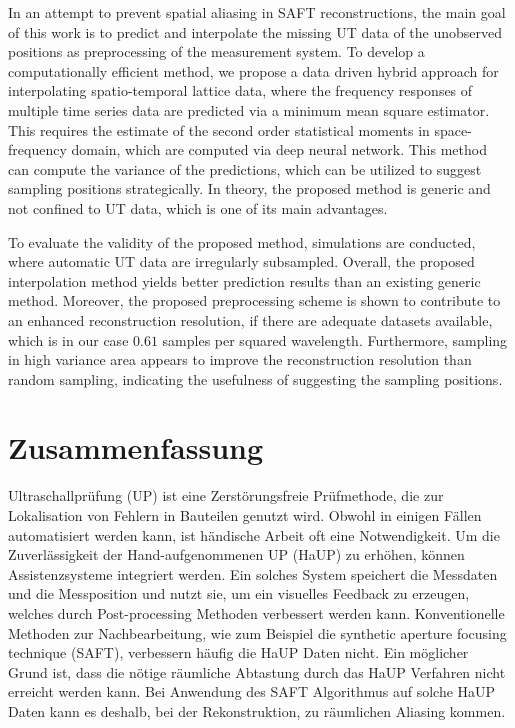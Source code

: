 In an attempt to prevent spatial aliasing in SAFT reconstructions, the main goal of this work is to predict and interpolate the missing UT data of the unobserved positions as preprocessing of the measurement system. To develop a computationally efficient method, we propose a data driven hybrid approach for interpolating spatio-temporal lattice data, where the frequency responses of multiple time series data are predicted via a minimum mean square estimator. This requires the estimate of the second order statistical moments in space-frequency domain, which are computed via deep neural network. %
This method can compute the variance of the predictions, which can be utilized to suggest sampling positions strategically. In theory, the proposed method is generic and not confined to UT data, which is one of its main advantages. \par

To evaluate the validity of the proposed method, simulations are conducted, where automatic UT data are irregularly subsampled. Overall, the proposed interpolation method yields better prediction results than an existing generic method. Moreover, the proposed preprocessing scheme is shown to contribute to an enhanced reconstruction resolution, if there are adequate datasets available, which is in our case $0.61$ samples per squared wavelength. Furthermore, sampling in high variance area appears to improve the reconstruction resolution than random sampling, indicating the usefulness of suggesting the sampling positions. \par



\chapter*{\centering Zusammenfassung} 
Ultraschallprüfung (UP) ist eine Zerstörungsfreie Prüfmethode, die zur Lokalisation von Fehlern in Bauteilen genutzt wird. Obwohl in einigen Fällen automatisiert werden kann, ist händische Arbeit oft eine Notwendigkeit. Um die Zuverlässigkeit der Hand-aufgenommenen UP (HaUP) zu erhöhen, können Assistenzsysteme integriert werden. Ein solches System speichert die Messdaten und die Messposition und nutzt sie, um ein visuelles Feedback zu erzeugen, welches durch Post-processing Methoden verbessert werden kann. Konventionelle Methoden zur Nachbearbeitung, wie zum Beispiel die synthetic aperture focusing technique (SAFT), verbessern häufig die HaUP Daten nicht. Ein möglicher Grund ist, dass die nötige räumliche Abtastung durch das HaUP Verfahren nicht erreicht werden kann. Bei Anwendung des SAFT Algorithmus auf solche HaUP Daten kann es deshalb, bei der Rekonstruktion, zu räumlichen Aliasing kommen. \par

